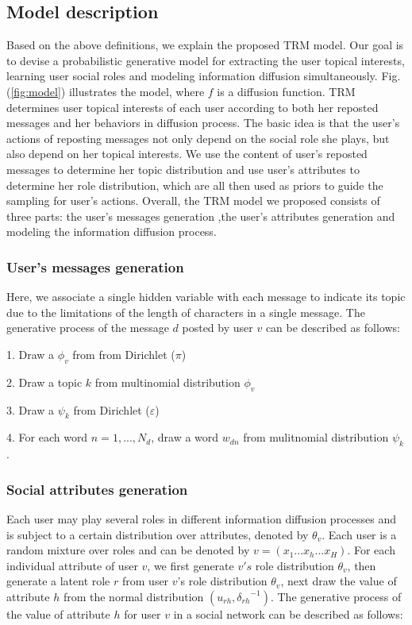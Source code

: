 \documentclass[runningheads,a4paper]{llncs}
\begin{document}
\subsection{Model description}
Based on the above definitions, we explain the proposed TRM model. Our goal is to devise a probabilistic generative model for extracting the user topical interests, learning user social roles and modeling information diffusion simultaneously. Fig.(\ref{fig:model}) illustrates the model, where $f$ is a diffusion function. TRM determines user topical interests of each user according to both her reposted messages and her behaviors in diffusion process. The basic idea is that the user's actions of reposting messages not only depend on the social role she plays, but also depend on her topical interests. We use the content of user's reposted messages to determine her topic distribution and use user's attributes to determine her role distribution, which are all then used as priors to guide the sampling for user's actions. Overall, the TRM model we proposed consists of three parts: the user's messages generation ,the user's attributes generation and modeling the information diffusion process.

\subsubsection{User's messages generation}
Here, we associate a single hidden variable with each message to indicate its topic due to the limitations of the length of characters in a single message. The generative process of the message $d$ posted by user $v$ can be described as follows:

1. Draw a ${\phi _v}$ from from Dirichlet (${\pi}$)

2. Draw a topic $k$ from multinomial distribution ${\phi _v}$

3. Draw a ${\psi _k}$ from Dirichlet (${\varepsilon}$)

4. For each word $n=1,...,{N_d}$, draw a word ${w_{dn}}$ from mulitnomial distribution ${\psi _k}$.


\subsubsection{\textbf{Social attributes generation}}
Each user may play several roles in different information diffusion processes and is subject to a certain distribution over attributes, denoted by $\theta _v$. Each user is a random mixture over roles and can be denoted by $ v = ({x_1}...{x_h}...{x_H})$. For each individual attribute of user $v$, we first generate $v's$ role distribution ${\theta _v}$, then generate a latent role $r$ from user $v$'s role distribution ${\theta _v}$, next draw the value of attribute $h$ from the normal distribution $({u_{rh}},{ \delta _{rh}}^{ - 1})$.
\emph{}The generative process of the value of attribute $h$ for user $v$ in a social network can be described as follows:
\end{document}
